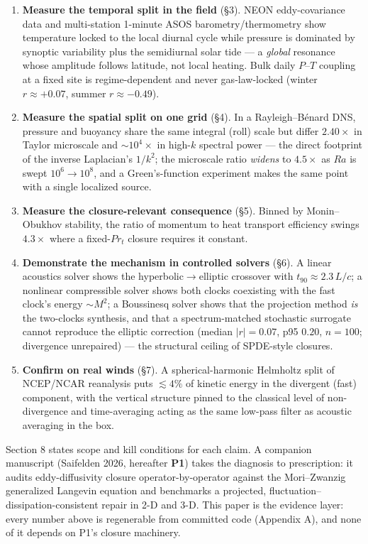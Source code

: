 \documentclass[aps,prfluids,preprint,superscriptaddress,nofootinbib]{revtex4-2}
\begin{document}
\begin{enumerate}
\item \textbf{Measure the temporal split in the field} (\S3). NEON eddy-covariance data and multi-station 1-minute ASOS barometry/thermometry show temperature locked to the local diurnal cycle while pressure is dominated by synoptic variability plus the semidiurnal solar tide --- a \emph{global} resonance whose amplitude follows latitude, not local heating. Bulk daily $P$--$T$ coupling at a fixed site is regime-dependent and never gas-law-locked (winter $r\approx +0.07$, summer $r\approx -0.49$).
\item \textbf{Measure the spatial split on one grid} (\S4). In a Rayleigh--B\'enard DNS, pressure and buoyancy share the same integral (roll) scale but differ $2.40\times$ in Taylor microscale and $\sim 10^{4}\times$ in high-$k$ spectral power --- the direct footprint of the inverse Laplacian's $1/k^{2}$; the microscale ratio \emph{widens} to $4.5\times$ as $Ra$ is swept $10^{6}\to 10^{8}$, and a Green's-function experiment makes the same point with a single localized source.
\item \textbf{Measure the closure-relevant consequence} (\S5). Binned by Monin--Obukhov stability, the ratio of momentum to heat transport efficiency swings $4.3\times$ where a fixed-$Pr_{t}$ closure requires it constant.
\item \textbf{Demonstrate the mechanism in controlled solvers} (\S6). A linear acoustics solver shows the hyperbolic$\to$elliptic crossover with $t_{90}\approx 2.3\,L/c$; a nonlinear compressible solver shows both clocks coexisting with the fast clock's energy $\sim M^{2}$; a Boussinesq solver shows that the projection method \emph{is} the two-clocks synthesis, and that a spectrum-matched stochastic surrogate cannot reproduce the elliptic correction (median $|r|=0.07$, p95 $0.20$, $n=100$; divergence unrepaired) --- the structural ceiling of SPDE-style closures.
\item \textbf{Confirm on real winds} (\S7). A spherical-harmonic Helmholtz split of NCEP/NCAR reanalysis puts $\lesssim 4\%$ of kinetic energy in the divergent (fast) component, with the vertical structure pinned to the classical level of non-divergence and time-averaging acting as the same low-pass filter as acoustic averaging in the box.
\end{enumerate}

Section 8 states scope and kill conditions for each claim. A companion manuscript (Saifelden 2026, hereafter \textbf{P1}) takes the diagnosis to prescription: it audits eddy-diffusivity closure operator-by-operator against the Mori--Zwanzig generalized Langevin equation and benchmarks a projected, fluctuation--dissipation-consistent repair in 2-D and 3-D. This paper is the evidence layer: every number above is regenerable from committed code (Appendix A), and none of it depends on P1's closure machinery.
\end{document}
